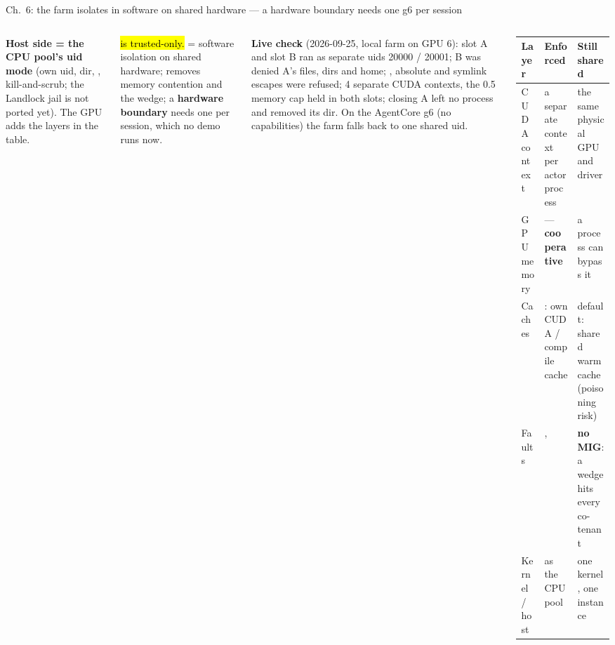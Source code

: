 \begin{frame}{Ch.\ 6: the farm isolates in software on shared hardware --- a hardware boundary needs one g6 per session}
\begin{columns}[T]
{\scriptsize\textbf{Host side = the CPU pool's uid mode} (own uid,  dir, , kill-and-scrub; the Landlock jail is not ported yet). The GPU adds the layers in the table.\par}
\vspace{1.5mm}
{\scriptsize\hl{ is trusted-only.} \textbf{} = software isolation on shared hardware; \textbf{} removes memory contention and the wedge; a \textbf{hardware boundary} needs one  per session, which no demo runs now.\par}
\vspace{1.5mm}
{\scriptsize\textbf{Live check} (2026-09-25, local farm on GPU 6): slot A and slot B ran as separate uids 20000 / 20001; B was denied A's files, dirs and home; , absolute and symlink escapes were refused; 4 separate CUDA contexts, the 0.5 memory cap held in both slots; closing A left no process and removed its dir. On the AgentCore g6 (no capabilities) the farm falls back to one shared uid.\par}
\scriptsize\setlength{\tabcolsep}{3pt}
\begin{tabularx}{\linewidth}{@{}>{\raggedright\arraybackslash}p{1.35cm} Y Y@{}}
\toprule
\textbf{Layer} & \textbf{Enforced} & \textbf{Still shared}\\
\midrule
CUDA context & a separate context per actor process & the same physical GPU and driver\\
GPU memory & \allowbreak{} --- \textbf{cooperative} & a process can bypass it\\
Caches & : own CUDA / compile cache & default: shared warm cache (poisoning risk)\\
Faults &  ,  & \textbf{no MIG}: a wedge hits every co-tenant\\
Kernel / host & as the CPU pool & one kernel, one instance\\
\bottomrule
\end{tabularx}
\end{columns}
\end{frame}

